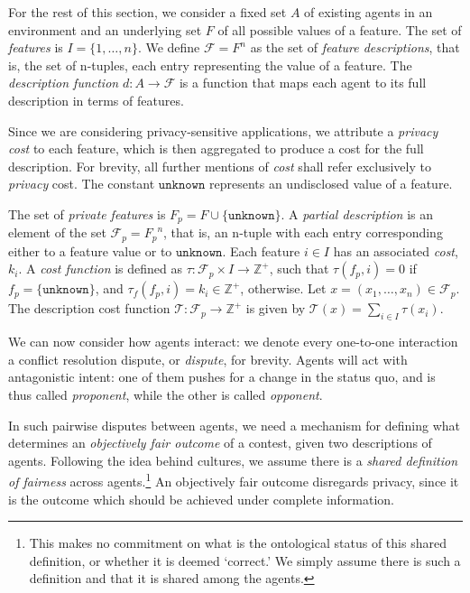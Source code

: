 \documentclass[acmsmall]{custom-arxiv}  %
\newcommand{\featureset}{\ensuremath{I}}
\begin{document}
\begin{definition}[Description]
For the rest of this section, we consider a fixed set $A$ of existing agents in an environment and an underlying set $F$ of all possible values of a feature. The set of \textit{features} is $\featureset = \{1, \dots, n\}$. We define $\mathcal{F} = F^n$ as the set of \textit{feature descriptions}, that is, the set of n-tuples, each entry representing the value of a feature. The \textit{description function} $d: A \rightarrow \mathcal{F}$ is a function that maps each agent to its full description in terms of features.
\end{definition}

Since we are considering privacy-sensitive applications, we attribute a \textit{privacy cost} to each feature, which is then aggregated to produce a cost for the full description. For brevity, all further mentions of \textit{cost} shall refer exclusively to \textit{privacy} cost. The constant \(\texttt{unknown}\) represents an undisclosed value of a feature. 



\begin{definition}
\label{definition:privacy-cost}
The set of \textit{private features} is $F_p = F \cup \{\texttt{unknown}\}$. A \textit{partial description} is an element of the set $\mathcal{F}_p = {F_{p}}^n$, that is, an n-tuple with each entry corresponding either to a feature value or to \(\texttt{unknown}\). Each feature $i \in \featureset$ has an associated \textit{cost}, $k_i$. A \textit{cost function} is defined as $\tau: \mathcal{F}_p \times \featureset \rightarrow \mathbb{Z}^{+}$, such that $\tau(f_p, i) = 0$ if $f_p = \{\texttt{unknown}\}$, and $\tau_f(f_p, i) = k_i \in \mathbb{Z}^{+}$, otherwise. Let $x = (x_1, \dots, x_n) \in \mathcal{F}_p$. The description cost function $\mathcal{T}: \mathcal{F}_p \rightarrow \mathbb{Z}^{+}$ is given by $\mathcal{T}(x) = \sum\limits_{i \in \featureset} \tau(x_i)$.
\end{definition}

We can now consider how agents interact: we denote every one-to-one interaction a conflict resolution dispute, or \textit{dispute}, for brevity. Agents will act with antagonistic intent: one of them pushes for a change in the status quo, and is thus called \textit{proponent}, while the other is called \textit{opponent}.

In such pairwise disputes between agents, we need a mechanism for defining what determines an \textit{objectively fair outcome} of a contest, given two descriptions of agents. Following the idea behind cultures, we assume there is a \textit{shared definition of fairness} across agents.\footnote{This makes no commitment on what is the ontological status of this shared definition, or whether it is deemed `correct.' We simply assume there is such a definition and that it is shared among the agents.} An objectively fair outcome disregards privacy, since it is the outcome which should be achieved under complete information.
\end{document}

